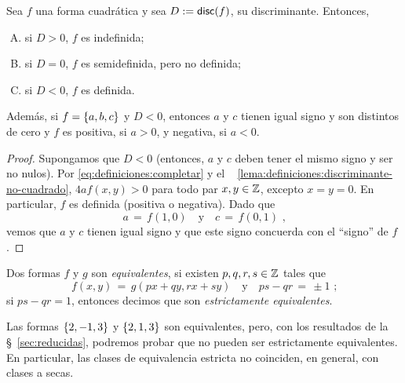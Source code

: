 \begin{teoDefiniciones}\label{teo:definiciones:valores}
	Sea $f$ una forma cuadr\'atica y sea $D:=\mathsf{disc}(f)$,
	su discriminante. Entonces,
	\begin{enumerate}[(A)]
		\item\label{item:definiciones:valores:indefinida}
			si $D>0$, $f$ es indefinida;
		\item\label{item:definiciones:valores:semidefinida}
			si $D=0$, $f$ es semidefinida, pero no definida;
		\item\label{item:definiciones:valores:definida}
			si $D<0$, $f$ es definida.
	\end{enumerate}
	Adem\'as, si $f=\left\{a,b,c\right\}$ y $D<0$, entonces $a$ y $c$
	tienen igual signo y son distintos de cero y $f$ es positiva,
	si $a>0$, y negativa, si $a<0$.
\end{teoDefiniciones}

\begin{proof}
	Supongamos que $D<0$
	(entonces, $a$ y $c$ deben tener el mismo signo y
	ser no nulos).
	Por \eqref{eq:definiciones:completar} y el \lemaname~%
	\ref{lema:definiciones:discriminante-no-cuadrado},
	$4af(x,y)>0$ para todo par $x,y\in\mathbb{Z}$, excepto
	$x=y=0$. En particular, $f$ es definida (positiva o
	negativa). Dado que
	\begin{displaymath}
		a\,=\,f(1,0)\quad\text{y}\quad
			c\,=\,f(0,1)
		\text{ ,}
	\end{displaymath}
	vemos que $a$ y $c$ tienen igual signo y que este
	signo concuerda con el ``signo'' de $f$.
\end{proof}

\begin{defDefiniciones}\label{def:definiciones:equivalencia}
	Dos formas $f$ y $g$ son \emph{equivalentes}, si existen
	$p,q,r,s\in\mathbb{Z}$ tales que
	\begin{displaymath}
		f(x,y)\,=\,g(px+qy,rx+sy)
		\quad\text{y}\quad
		ps-qr\,=\,\pm 1
		\text{ ;}
	\end{displaymath}
	si $ps-qr=1$, entonces decimos que son
	\emph{estrictamente equivalentes}.
\end{defDefiniciones}

\begin{ejemDefiniciones}\label{ejem:definiciones:equivalencia}
	Las formas $\left\{2,-1,3\right\}$ y $\left\{2,1,3\right\}$ son equivalentes,
	pero, con los resultados de la \S~\ref{sec:reducidas}, podremos
	probar que no pueden ser estrictamente equivalentes.
	En particular, las clases de equivalencia estricta no coinciden,
	en general, con clases a secas.
\end{ejemDefiniciones}

